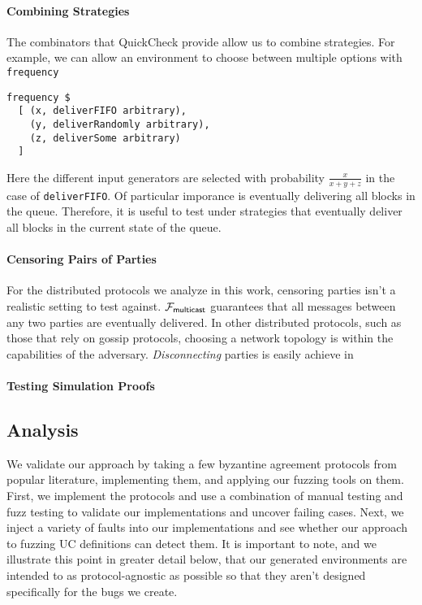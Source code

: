 \paragraph{Combining Strategies}
The combinators that QuickCheck provide allow us to combine strategies.
For example, we can allow an environment to choose between multiple options with \texttt{frequency}
\begin{lstlisting}
frequency $ 
  [ (x, deliverFIFO arbitrary),
  	(y, deliverRandomly arbitrary),
	(z, deliverSome arbitrary)
  ]
\end{lstlisting} 
Here the different input generators are selected with probability $\frac{x}{x+y+z}$ in the case of \texttt{deliverFIFO}.
Of particular imporance is eventually delivering all blocks in the queue. 
Therefore, it is useful to test under strategies that eventually deliver all blocks in the current state of the queue. 

\paragraph{Censoring Pairs of Parties}
For the distributed protocols we analyze in this work, censoring parties isn't a realistic setting to test against.
$\mathcal{F}_{{\mathsf {multicast}}}$ guarantees that all messages between any two parties are eventually delivered.
In other distributed protocols, such as those that rely on gossip protocols, choosing a network topology is within the capabilities of the adversary.
\emph{Disconnecting} parties is easily achieve in \us {}

\paragraph{Testing Simulation Proofs}


\subsection{Analysis}
We validate our approach by taking a few byzantine agreement protocols from popular literature, implementing them, and applying our fuzzing tools on them. 
First, we implement the protocols and use a combination of manual testing and fuzz testing to validate our implementations and uncover failing cases. 
Next, we inject a variety of faults into our implementations and see whether our approach to fuzzing UC definitions can detect them.
It is important to note, and we illustrate this point in greater detail below, that our generated environments are intended to as protocol-agnostic as possible so that they aren't designed specifically for the bugs we create.

